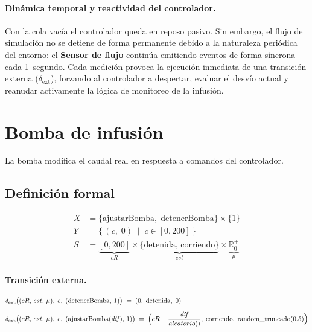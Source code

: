 \documentclass{article}
\newcommand{\dext}{\delta_{\mathrm{ext}}}
\begin{document}
\paragraph{Dinámica temporal y reactividad del controlador.}
Con la cola vacía el controlador queda en reposo pasivo. Sin embargo, el flujo
de simulación no se detiene de forma permanente debido a la naturaleza periódica
del entorno: el \textbf{Sensor de flujo} continúa emitiendo eventos de forma
síncrona cada 1~segundo. Cada medición provoca la ejecución inmediata de una
transición externa ($\delta_{\mathrm{ext}}$), forzando al controlador a
despertar, evaluar el desvío actual y reanudar activamente la lógica de
monitoreo de la infusión.

\clearpage
\section{Bomba de infusión}

La bomba modifica el caudal real en respuesta a comandos del controlador.

\subsection{Definición formal}

\begin{align*}
  X &= \{\mathrm{ajustarBomba},\;\mathrm{detenerBomba}\}\times\{1\} \\[4pt]
  Y &= \{\,(c,\;0)\;\mid\;c\in[0,200]\,\} \\[4pt]
  S &= \underbrace{[0,200]}_{\mathit{cR}}
     \times \underbrace{\{\mathrm{detenida},\,\mathrm{corriendo}\}}_{\mathit{est}}
     \times \underbrace{\mathbb{R}_0^+}_{\mu}
\end{align*}

\paragraph{Transición externa.}

\begin{align*}
\dext&\bigl((cR,\,est,\,\mu),\;e,\;(\mathrm{detenerBomba},\,1)\bigr)
  \;=\; (0,\;\mathrm{detenida},\;0)
\\[6pt]
\dext&\bigl((cR,\,est,\,\mu),\;e,\;(\mathrm{ajustarBomba}(\mathit{dif}),\,1)\bigr)
  \;=\; \Bigl(cR + \frac{\mathit{dif}}{{aleatorio}()},\;
              \mathrm{corriendo},\;
              \mathrm{random\_truncado}(0.5)\Bigr)
\end{align*}
\end{document}
